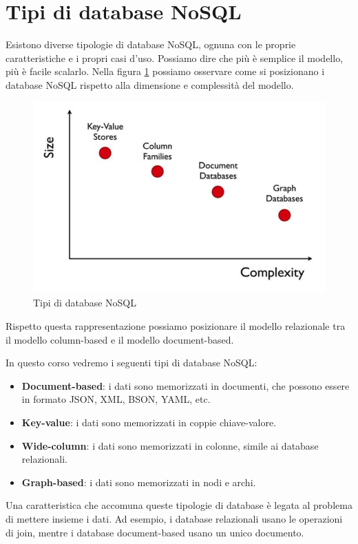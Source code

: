 \section{Tipi di database NoSQL}
Esistono diverse tipologie di database NoSQL, ognuna con le proprie caratteristiche
e i propri casi d'uso. Possiamo dire che più è semplice il modello, più è facile
scalarlo. Nella figura \ref{fig:tipi_nosql} possiamo osservare come si posizionano i
database NoSQL rispetto alla dimensione e complessità del modello.
\begin{figure}[!ht]
      \centering
      \includegraphics[scale=0.5]{./img/nosql/tipi_nosql.png}
      \caption{Tipi di database NoSQL}
      \label{fig:tipi_nosql}
\end{figure}

Rispetto questa rappresentazione possiamo posizionare il modello relazionale tra
il modello column-based e il modello document-based.

In questo corso vedremo i seguenti tipi di database NoSQL:
\begin{itemize}
      \item \textbf{Document-based}: i dati sono memorizzati in documenti, che
            possono essere in formato JSON, XML, BSON, YAML, etc.
      \item \textbf{Key-value}: i dati sono memorizzati in coppie chiave-valore.
      \item \textbf{Wide-column}: i dati sono memorizzati in colonne, simile ai
            database relazionali.
      \item \textbf{Graph-based}: i dati sono memorizzati in nodi e archi.
\end{itemize}
Una caratteristica che accomuna queste tipologie di database è legata al problema
di mettere insieme i dati. Ad esempio, i database relazionali usano le operazioni
di join, mentre i database document-based usano un unico documento.
